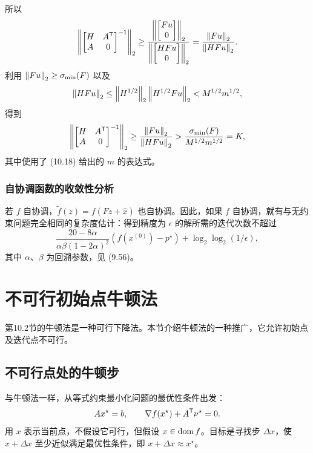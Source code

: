 所以
\[\left\|\begin{bmatrix}H&A^\mathsf T\\A&0\end{bmatrix}^{-1}\right\|_2\ge\frac{\left\|\begin{bmatrix}Fu\\0\end{bmatrix}\right\|_2}{\left\|\begin{bmatrix}HFu\\0\end{bmatrix}\right\|_2}=\frac{\left\lVert Fu\right\rVert_2}{\left\lVert HFu\right\rVert_2}.\]
利用 $\left\lVert Fu\right\rVert_2\ge\sigma_{\min}(F)$ 以及
\[\left\lVert HFu\right\rVert_2\le\left\lVert H^{1/2}\right\rVert_2\left\lVert H^{1/2}Fu\right\rVert_2<M^{1/2}m^{1/2},\]
得到
\[\left\|\begin{bmatrix}H&A^\mathsf T\\A&0\end{bmatrix}^{-1}\right\|_2\ge\frac{\left\lVert Fu\right\rVert_2}{\left\lVert HFu\right\rVert_2}>\frac{\sigma_{\min}(F)}{M^{1/2}m^{1/2}}=K,\]
其中使用了 (10.18) 给出的 $m$ 的表达式。

\subsubsection*{自协调函数的收敛性分析}
若 $f$ 自协调，$\widetilde f(z)=f(Fz+\widehat x)$ 也自协调。因此，如果 $f$ 自协调，就有与无约束问题完全相同的复杂度估计：得到精度为 $\epsilon$ 的解所需的迭代次数不超过
\[\frac{20-8\alpha}{\alpha\beta(1-2\alpha)^2}(f(x^{(0)})-p^\star)+\log_2\log_2(1/\epsilon),\]
其中 $\alpha$、$\beta$ 为回溯参数，见 (9.56)。

\section{不可行初始点牛顿法}
第10.2节的牛顿法是一种可行下降法。本节介绍牛顿法的一种推广，它允许初始点及迭代点不可行。

\subsection{不可行点处的牛顿步}
与牛顿法一样，从等式约束最小化问题的最优性条件出发：
\[Ax^\star=b,\qquad\nabla f(x^\star)+A^\mathsf T\nu^\star=0.\]
用 $x$ 表示当前点，不假设它可行，但假设 $x\in\operatorname{dom} f$。目标是寻找步 $\Delta x$，使 $x+\Delta x$ 至少近似满足最优性条件，即 $x+\Delta x\approx x^\star$。

